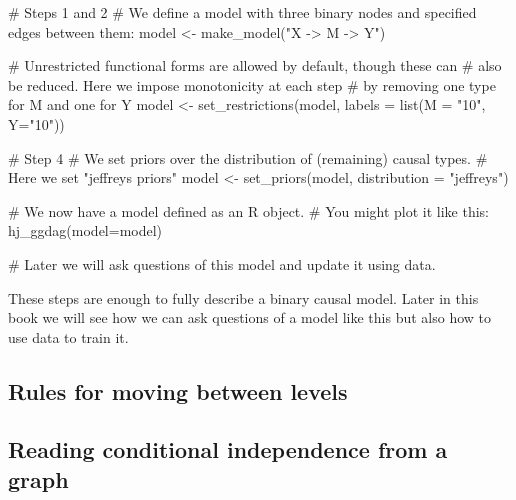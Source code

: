 \documentclass[
  12pt,
]{book}
\newenvironment{Shaded}{\begin{snugshade}}{\end{snugshade}}
\newcommand{\AttributeTok}[1]{\textcolor[rgb]{0.00,0.34,0.68}{#1}}
\newcommand{\CommentTok}[1]{\textcolor[rgb]{0.54,0.53,0.53}{#1}}
\newcommand{\FunctionTok}[1]{\textcolor[rgb]{0.39,0.29,0.61}{#1}}
\newcommand{\NormalTok}[1]{\textcolor[rgb]{0.12,0.11,0.11}{#1}}
\newcommand{\OtherTok}[1]{\textcolor[rgb]{0.00,0.43,0.16}{#1}}
\newcommand{\StringTok}[1]{\textcolor[rgb]{0.75,0.01,0.01}{#1}}
\begin{document}
\begin{Shaded}
\begin{Highlighting}[]
\CommentTok{\# Steps 1 and 2 }
\CommentTok{\# We define a model with three binary nodes and specified edges between them:}
\NormalTok{model }\OtherTok{\textless{}{-}} \FunctionTok{make\_model}\NormalTok{(}\StringTok{"X {-}\textgreater{} M {-}\textgreater{} Y"}\NormalTok{)}

\CommentTok{\# Unrestricted functional forms are allowed by default, though these can }
\CommentTok{\# also be reduced. Here we impose monotonicity at each step }
\CommentTok{\# by removing one type for M and one for Y}
\NormalTok{model }\OtherTok{\textless{}{-}} \FunctionTok{set\_restrictions}\NormalTok{(model, }\AttributeTok{labels =} \FunctionTok{list}\NormalTok{(}\AttributeTok{M =} \StringTok{"10"}\NormalTok{, }\AttributeTok{Y=}\StringTok{"10"}\NormalTok{))}

\CommentTok{\# Step 4}
\CommentTok{\# We set priors over the distribution of (remaining) causal types.}
\CommentTok{\# Here we set "jeffreys priors"}
\NormalTok{model }\OtherTok{\textless{}{-}} \FunctionTok{set\_priors}\NormalTok{(model, }\AttributeTok{distribution =} \StringTok{"jeffreys"}\NormalTok{)}

\CommentTok{\# We now have a model defined as an R object. }
\CommentTok{\# You might plot it like this:}
\FunctionTok{hj\_ggdag}\NormalTok{(}\AttributeTok{model=}\NormalTok{model)}

\CommentTok{\# Later we will ask questions of this model and update it using data.}
\end{Highlighting}
\end{Shaded}

These steps are enough to fully describe a binary causal model. Later in this book we will see how we can ask questions of a model like this but also how to use data to train it.

\hypertarget{rules-for-moving-between-levels}{%
\subsection{Rules for moving between levels}\label{rules-for-moving-between-levels}}

\hypertarget{reading-conditional-independence-from-a-graph}{%
\subsection{Reading conditional independence from a graph}\label{reading-conditional-independence-from-a-graph}}
\end{document}
